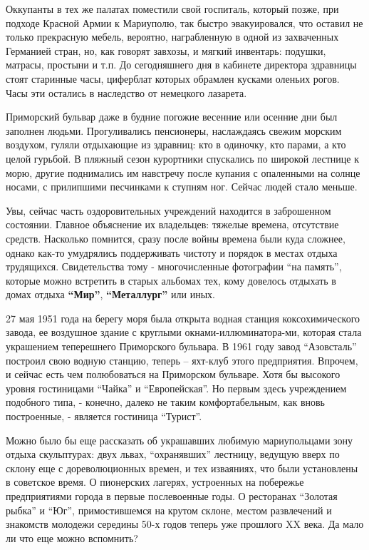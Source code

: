 Оккупанты в тех же палатах поместили свой госпиталь, который позже, при подходе
Красной Армии к Мариуполю, так быстро эвакуировался, что оставил не только
прекрасную мебель, вероятно, награбленную в одной из захваченных Германией
стран, но, как говорят завхозы, и мягкий инвентарь: подушки, матрасы, простыни
и т.п. До сегодняшнего дня в кабинете директора здравницы стоят старинные часы,
циферблат которых обрамлен кусками оленьих рогов. Часы эти остались в
наследство от немецкого лазарета.


Приморский бульвар даже в будние погожие весенние или осенние дни был заполнен
людьми. Прогуливались пенсионеры, наслаждаясь свежим морским воздухом, гуляли
отдыхающие из здравниц: кто в одиночку, кто парами, а кто целой гурьбой. В
пляжный сезон курортники спускались по широкой лестнице к морю, другие
поднимались им навстречу после купания с опаленными на солнце носами, с
прилипшими песчинками к ступням ног. Сейчас людей стало меньше.

Увы, сейчас часть оздоровительных учреждений находится в заброшенном состоянии.
Главное объяснение их владельцев: тяжелые времена, отсутствие средств.
Насколько помнится, сразу после войны времена были куда сложнее, однако как-то
умудрялись поддерживать чистоту и порядок в местах отдыха трудящихся.
Свидетельства тому - многочисленные фотографии \enquote{на память}, которые можно
встретить в старых альбомах тех, кому довелось отдыхать в домах отдыха \textbf{\enquote{Мир}},
\textbf{\enquote{Металлург}} или иных.

27 мая 1951 года на берегу моря была открыта водная станция коксохимического
завода, ее воздушное здание с круглыми окнами-иллюминатора\hyp{}ми, которая стала
украшением теперешнего Приморского бульвара. В 1961 году завод \enquote{Азовсталь}
построил свою водную станцию, теперь – яхт-клуб этого предприятия. Впрочем, и
сейчас есть чем полюбоваться на Приморском бульваре. Хотя бы высокого уровня
гостиницами \enquote{Чайка} и \enquote{Европейская}. Но первым здесь учреждением подобного
типа, - конечно, далеко не таким комфортабельным, как вновь построенные, -
является гостиница \enquote{Турист}.


Можно было бы еще рассказать об украшавших любимую мариупольцами зону отдыха
скульптурах: двух львах, \enquote{охранявших} лестницу, ведущую вверх по склону еще с
дореволюционных времен, и тех изваяниях, что были установлены в советское
время. О пионерских лагерях, устроенных на побережье предприятиями города в
первые послевоенные годы. О ресторанах \enquote{Золотая рыбка} и \enquote{Юг}, примостившемся
на крутом склоне, местом развлечений и знакомств молодежи середины 50-х годов
теперь уже прошлого ΧΧ века. Да мало ли что еще можно вспомнить?

